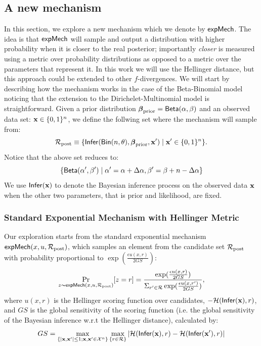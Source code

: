 \documentclass{article}
\begin{document}
\subsection{A new mechanism}
In this section, we explore a new mechanism which we denote by $\mathsf{expMech}$.
The idea is that $\mathsf{expMech}$ will sample and output a distribution with higher probability when
it is closer to the real posterior; importantly  \emph{closer} is measured using a metric over probability
distributions as opposed to a metric over the parameters that represent it. In this work we will
use the Hellinger distance, but this approach could be extended to other $f$-divergences. We will
start by describing how the mechanism works in the case of the Beta-Binomial model noticing that
the extension to the Dirichelet-Multinomial model is straightforward.
Given a prior distribution $\boldsymbol{\beta}_{\textup{prior}}=\mathsf{Beta}(\alpha, \beta)$ and an observed data set: $\textbf{x}\in\{0,1\}^n$,
we define the follwing set  where the mechanism will sample from:
\[
  \mathcal{R}_{\textup{post}}\equiv\{\mathsf{Infer}(\mathsf{Bin}(n, \theta), \boldsymbol{\beta}_{\textup{prior}},\textbf{x}')\mid \textbf{x}' \in \{0,1\}^n\}.
\]
Notice that the above set reduces to:
\[
  \{\mathsf{Beta}(\alpha',\beta')\mid \alpha'=\alpha + \Delta\alpha, \beta'=\beta + n-\Delta\alpha\}
\]
We use $\mathsf{Infer}(\textbf{x})$ to denote the Bayesian inference process on the observed data $\textbf{x}$
when the other two parameters, that is prior and likelihood, are fixed. 

\subsubsection{Standard Exponential Mechanism with Hellinger Metric}
Our exploration starts from the standard exponential mechanism $\mathsf{expMech}(x,u,\mathcal{R}_{\textup{post}})$, which samples an element from the candidate set $\mathcal{R}_{\textup{post}}$ with probability proportional to $\exp(\frac{\epsilon u(x,r)}{2 GS})$:
\[
\underset{z \thicksim \mathsf{expMech}(x,u,\mathcal{R}_{\textup{post}}) }{\Pr}[z=r] = \frac
{\exp(\frac{\epsilon u(x,r)}{2 GS})}
{\Sigma_{r' \in \mathcal{R}}\exp(\frac{\epsilon u(x,r')}{2 GS})},
\]
where $u(x,r)$ is the Hellinger scoring function over candidates, $-\mathcal{H}(\mathsf{Infer}(\textbf{x}), r)$, and $GS$ is the global sensitivity of the scoring function (i.e. the global sensitivity of the Bayesian inference w.r.t the Hellinger distance), calculated by:
\begin{equation*}
GS = 
\max_{\{|\textbf{x},\textbf{x}'| \leq 1;\textbf{x},\textbf{x}'\in \mathcal{X}^n\}}\max_{\{r\in \mathcal{R}\}}
|\mathcal{H}(\mathsf{Infer}(\textbf{x}), r) - \mathcal{H}(\mathsf{Infer}(\textbf{x}'), r)|
\end{equation*}
\end{document}
